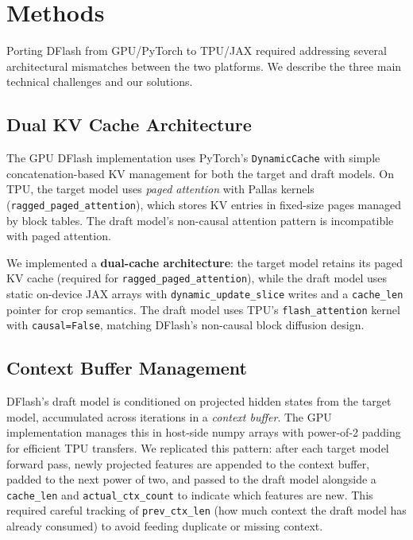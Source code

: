 \documentclass[12pt,letterpaper]{article}
\begin{document}
\section{Methods}

Porting DFlash from GPU/PyTorch to TPU/JAX required addressing several architectural mismatches between the two platforms. We describe the three main technical challenges and our solutions.

\subsection{Dual KV Cache Architecture}

The GPU DFlash implementation uses PyTorch's \texttt{DynamicCache} with simple concatenation-based KV management for both the target and draft models. On TPU, the target model uses \emph{paged attention} with Pallas kernels (\texttt{ragged\_paged\_attention}), which stores KV entries in fixed-size pages managed by block tables. The draft model's non-causal attention pattern is incompatible with paged attention.

We implemented a \textbf{dual-cache architecture}: the target model retains its paged KV cache (required for \texttt{ragged\_paged\_attention}), while the draft model uses static on-device JAX arrays with \texttt{dynamic\_update\_slice} writes and a \texttt{cache\_len} pointer for crop semantics. The draft model uses TPU's \texttt{flash\_attention} kernel with \texttt{causal=False}, matching DFlash's non-causal block diffusion design.

\subsection{Context Buffer Management}

DFlash's draft model is conditioned on projected hidden states from the target model, accumulated across iterations in a \emph{context buffer}. The GPU implementation manages this in host-side numpy arrays with power-of-2 padding for efficient TPU transfers. We replicated this pattern: after each target model forward pass, newly projected features are appended to the context buffer, padded to the next power of two, and passed to the draft model alongside a \texttt{cache\_len} and \texttt{actual\_ctx\_count} to indicate which features are new. This required careful tracking of \texttt{prev\_ctx\_len} (how much context the draft model has already consumed) to avoid feeding duplicate or missing context.
\end{document}
